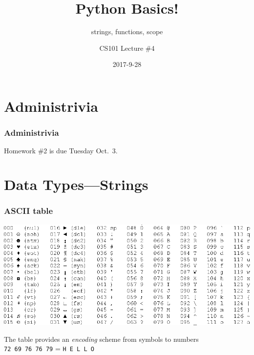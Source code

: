 \documentclass[11pt]{beamer}
\title{Python Basics!}
\subtitle{strings, functions, scope}
\author{CS101 Lecture \#4}
\date{2017-9-28}
\begin{document}
  \setcounter{showProgressBar}{0}
  \setcounter{showSlideNumbers}{0}

\frame{\titlepage}

\setcounter{framenumber}{0}
\setcounter{showProgressBar}{1}
\setcounter{showSlideNumbers}{1}

\section{Administrivia}

\begin{frame}
  \frametitle{Administrivia}
  \Enlarge
  \begin{itemize}
  \myitem  Homework \#2 is due Tuesday Oct.\ 3. 
  \end{itemize}
\end{frame}


\section{Data Types---Strings}

\begin{frame}
  \frametitle{ASCII table}
  \Enlarge
  \includegraphics[width=\textwidth]{./img/ascii-table.png} \\ \pause
  
  {\small The table provides an \emph{encoding} scheme from symbols to numbers} \\
  \texttt{72 69 76 76 79} = \texttt{H E L L O} %
  
\end{frame}
\end{document}
